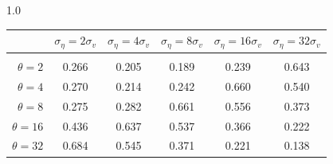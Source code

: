 \documentclass[12pt]{article}
\begin{document}
\begin{table}[h!]
\begin{subtable}{1.0\textwidth}
    \centering
\begin{tabular}{rccccc}
\hline  
            & \multicolumn{1}{l}{$\sigma_{\eta} =2\sigma_{v}$} & \multicolumn{1}{l}{$\sigma_{\eta} =4\sigma_{v}$} & \multicolumn{1}{l}{$\sigma_{\eta} =8\sigma_{v}$} & \multicolumn{1}{l}{$\sigma_{\eta} =16\sigma_{v}$} & \multicolumn{1}{l}{$\sigma_{\eta} =32\sigma_{v}$} \\ \hline  \vspace{-3mm} \\        
$\theta=2$  & 0.266                                             & 0.205                                             & 0.189                                             & 0.239                                              & 0.643                                              \\ \hline
$\theta=4$  & 0.270                                             & 0.214                                             & 0.242                                             & 0.660                                              & 0.540                                              \\ \hline
$\theta=8$  & 0.275                                             & 0.282                                             & 0.661                                             & 0.556                                              & 0.373                                              \\ \hline
$\theta=16$ & 0.436                                             & 0.637                                             & 0.537                                             & 0.366                                              & 0.222                                              \\ \hline
$\theta=32$ & 0.684                                             & 0.545                                             & 0.371                                             & 0.221                                              & 0.138                                              \\ \hline
\end{tabular}
\end{subtable}


\end{table}
\end{document}
